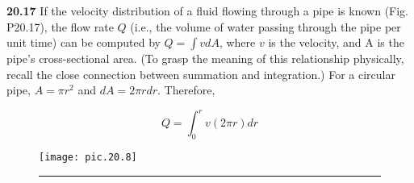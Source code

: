 \documentclass[../main.tex]{subfiles}
\begin{document}
\begin{multicols}{2}
\textbf{20.17} If the velocity distribution of a fluid flowing through
a pipe is known (Fig. P20.17), the flow rate $Q$ (i.e., the volume of water passing through the pipe per unit time) can be
computed by $Q = \int v dA$, where $v$ is the velocity, and A is
the pipe's cross-sectional area. (To grasp the meaning of this
relationship physically, recall the close connection between
summation and integration.) For a circular pipe, $A = \pi r^{2}$ and $dA = 2 \pi r dr$. Therefore,

	$$Q = \int^{r}_{0} v(2 \pi r) dr$$
	



\end{multicols}

\begin{figure}[hbt!]
	\texttt{[image: pic.20.8]}
	\caption{} \hrule
	\label{pic.20.8}
\end{figure}
\end{document}
